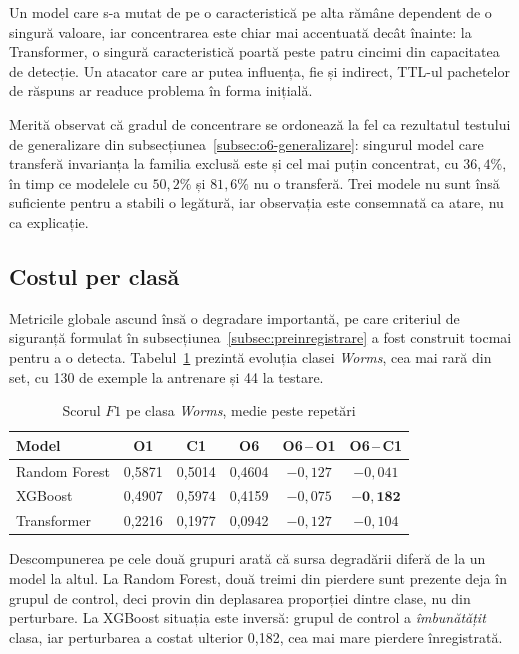 Un model care s-a mutat de pe o caracteristică pe alta rămâne dependent de o singură valoare, iar concentrarea este chiar mai accentuată decât înainte: la Transformer, o singură caracteristică poartă peste patru cincimi din capacitatea de detecție. Un atacator care ar putea influența, fie și indirect, TTL-ul pachetelor de răspuns ar readuce problema în forma inițială.

Merită observat că gradul de concentrare se ordonează la fel ca rezultatul testului de generalizare din subsecțiunea~\ref{subsec:o6-generalizare}: singurul model care transferă invarianța la familia exclusă este și cel mai puțin concentrat, cu $36{,}4\%$, în timp ce modelele cu $50{,}2\%$ și $81{,}6\%$ nu o transferă. Trei modele nu sunt însă suficiente pentru a stabili o legătură, iar observația este consemnată ca atare, nu ca explicație.

\subsection{Costul per clasă}\label{subsec:o6-perclasa}

Metricile globale ascund însă o degradare importantă, pe care criteriul de siguranță formulat în subsecțiunea~\ref{subsec:preinregistrare} a fost construit tocmai pentru a o detecta. Tabelul~\ref{tab:o6-worms} prezintă evoluția clasei \textit{Worms}, cea mai rară din set, cu 130 de exemple la antrenare și 44 la testare.

\begin{table}[!ht]
    \caption{Scorul $F1$ pe clasa \textit{Worms}, medie peste repetări}
    \centering
    \begin{tabular}{|l|c|c|c|c|c|}
        \hline
        \textbf{Model} & \textbf{O1} & \textbf{C1} & \textbf{O6} & \textbf{O6\,--\,O1} & \textbf{O6\,--\,C1} \\
        \hline
        Random Forest       & 0,5871 & 0,5014 & 0,4604 & $-0{,}127$ & $-0{,}041$ \\
        \hline
        XGBoost & 0,4907 & 0,5974 & 0,4159 & $-0{,}075$ & $\mathbf{-0{,}182}$ \\
        \hline
        Transformer       & 0,2216 & 0,1977 & 0,0942 & $-0{,}127$ & $-0{,}104$ \\
        \hline
    \end{tabular}
    \label{tab:o6-worms}
\end{table}

Descompunerea pe cele două grupuri arată că sursa degradării diferă de la un model la altul. La Random Forest, două treimi din pierdere sunt prezente deja în grupul de control, deci provin din deplasarea proporției dintre clase, nu din perturbare. La XGBoost situația este inversă: grupul de control a \emph{îmbunătățit} clasa, iar perturbarea a costat ulterior 0,182, cea mai mare pierdere înregistrată.

